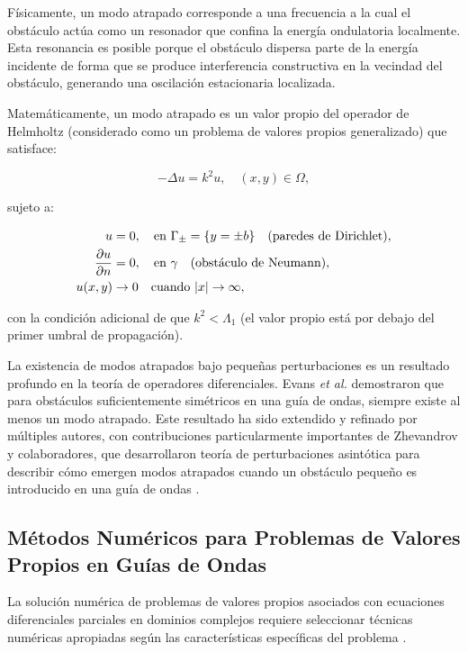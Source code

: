 \documentclass[11pt]{article}
\begin{document}
Físicamente, un modo atrapado corresponde a una frecuencia a la cual el obstáculo actúa como un resonador que confina la energía ondulatoria localmente. Esta resonancia es posible porque el obstáculo dispersa parte de la energía incidente de forma que se produce interferencia constructiva en la vecindad del obstáculo, generando una oscilación estacionaria localizada.

Matemáticamente, un modo atrapado es un valor propio del operador de Helmholtz (considerado como un problema de valores propios generalizado) que satisface:

\begin{equation}
-\Delta u = k^2 u, \quad (x, y) \in \Omega,
\end{equation}

sujeto a:

\begin{align}
u &= 0, \quad \text{en } \Gamma_\pm = \{y = \pm b\} \quad (\text{paredes de Dirichlet}), \\
\pdv{u}{n} &= 0, \quad \text{en } \gamma \quad (\text{obstáculo de Neumann}), \\
u(x,y) &\to 0 \quad \text{cuando } |x| \to \infty,
\end{align}

con la condición adicional de que $k^2 < \Lambda_1$ (el valor propio está por debajo del primer umbral de propagación).

La existencia de modos atrapados bajo pequeñas perturbaciones es un resultado profundo en la teoría de operadores diferenciales. Evans \emph{et al.} \cite{Evans1994} demostraron que para obstáculos suficientemente simétricos en una guía de ondas, siempre existe al menos un modo atrapado. Este resultado ha sido extendido y refinado por múltiples autores, con contribuciones particularmente importantes de Zhevandrov y colaboradores, que desarrollaron teoría de perturbaciones asintótica para describir cómo emergen modos atrapados cuando un obstáculo pequeño es introducido en una guía de ondas \cite{Zhevandrov2019, Zhevandrov2025}.

\subsection{Métodos Numéricos para Problemas de Valores Propios en Guías de Ondas}

La solución numérica de problemas de valores propios asociados con ecuaciones diferenciales parciales en dominios complejos requiere seleccionar técnicas numéricas apropiadas según las características específicas del problema \cite{Bao2021}.
\end{document}
